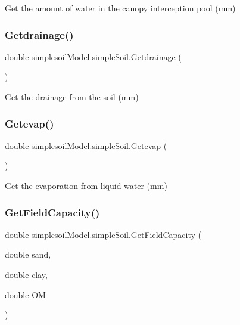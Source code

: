 Get the amount of water in the canopy interception pool (mm) 

\mbox{\label{classsimplesoil_model_1_1simple_soil_a9809c673d928e457714aff6a2da5803e}} 
\subsubsection{\texorpdfstring{Getdrainage()}{Getdrainage()}}
{\footnotesize\ttfamily double simplesoil\+Model.\+simple\+Soil.\+Getdrainage (\begin{DoxyParamCaption}{ }\end{DoxyParamCaption})\hspace{0.3cm}{\ttfamily [inline]}}



Get the drainage from the soil (mm) 

\mbox{\label{classsimplesoil_model_1_1simple_soil_a39baf3c0ecbb38d43dae18dedce649be}} 
\subsubsection{\texorpdfstring{Getevap()}{Getevap()}}
{\footnotesize\ttfamily double simplesoil\+Model.\+simple\+Soil.\+Getevap (\begin{DoxyParamCaption}{ }\end{DoxyParamCaption})\hspace{0.3cm}{\ttfamily [inline]}}



Get the evaporation from liquid water (mm) 

\mbox{\label{classsimplesoil_model_1_1simple_soil_a4ba9c7c0f072654666128bc23e3693a2}} 
\subsubsection{\texorpdfstring{GetFieldCapacity()}{GetFieldCapacity()}}
{\footnotesize\ttfamily double simplesoil\+Model.\+simple\+Soil.\+Get\+Field\+Capacity (\begin{DoxyParamCaption}\item[{double}]{sand,  }\item[{double}]{clay,  }\item[{double}]{OM }\end{DoxyParamCaption})\hspace{0.3cm}{\ttfamily [inline]}}



